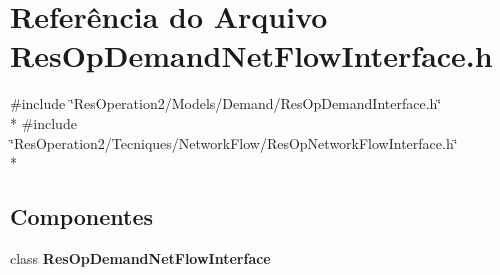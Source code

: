 \section{Referência do Arquivo Res\+Op\+Demand\+Net\+Flow\+Interface.\+h}
\label{_res_op_demand_net_flow_interface_8h}
{\ttfamily \#include \char`\"{}Res\+Operation2/\+Models/\+Demand/\+Res\+Op\+Demand\+Interface.\+h\char`\"{}}\\*
{\ttfamily \#include \char`\"{}Res\+Operation2/\+Tecniques/\+Network\+Flow/\+Res\+Op\+Network\+Flow\+Interface.\+h\char`\"{}}\\*
\subsection*{Componentes}
\begin{DoxyCompactItemize}
\item 
class {\bf Res\+Op\+Demand\+Net\+Flow\+Interface}
\end{DoxyCompactItemize}
